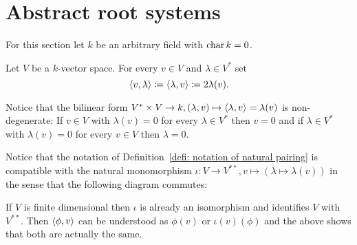\section{Abstract root systems}
For this section let $k$ be an arbitrary field with $\operatorname{char} k = 0$.


\begin{defi}\label{defi: notation of natural pairing}
 Let $V$ be a $k$-vector space. For every $v \in V$ and $\lambda \in V^*$ set
 \[
  \left\langle v, \lambda\right\rangle \coloneqq \left\langle \lambda, v\right\rangle \coloneqq2 \lambda(v).
 \]
\end{defi}


\begin{rem}\label{rem: natural pairing is nondegenerate}
 Notice that the bilinear form $V^* \times V \to k, (\lambda,  v) \mapsto \left\langle \lambda, v\right\rangle = \lambda(v)$ is non-degenerate: If $v \in V$ with $\lambda(v) = 0$ for every $\lambda \in V^*$ then $v = 0$ and if $\lambda \in V^*$ with $\lambda(v) = 0$ for every $v \in V$ then $\lambda = 0$.
\end{rem}


\begin{rem}
 Notice that the notation of Definition~\ref{defi: notation of natural pairing} is compatible with the natural monomorphism $\iota \colon V \to V^{**}, v \mapsto (\lambda \mapsto \lambda(v))$ in the sense that the following diagram commutes:

 \begin{center}
 \end{center}
 
 If $V$ is finite dimensional then $\iota$ is already an isomorphism and identifies $V$ with $V^{**}$. Then $\left\langle \phi, v\right\rangle$ can be understood as $\phi(v)$ or $\iota(v)(\phi)$ and the above shows that both are actually the same.
\end{rem}


